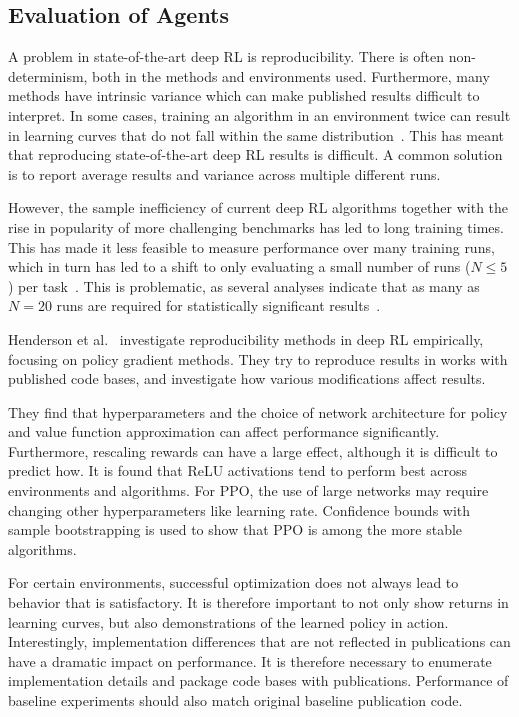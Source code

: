 \subsection{Evaluation of Agents}
\label{sec:theory-evaluation}

A problem in state-of-the-art deep RL is reproducibility.
There is often non-determinism, both in the methods and environments used.
Furthermore, many methods have intrinsic variance which can make published results difficult to interpret.
In some cases, training an algorithm in an environment twice can result in learning curves that do not fall within the same distribution~\cite{henderson_deep_2018}.
This has meant that reproducing state-of-the-art deep RL results is difficult.
A common solution is to report average results and variance across multiple different runs.

However, the sample inefficiency of current deep RL algorithms together with the rise in popularity of more challenging benchmarks has led to long training times.
This has made it less feasible to measure performance over many training runs,
which in turn has led to a shift to only evaluating a small number of runs (\(N \leq 5\)) per task~\cite{agarwal_deep_2022}.
This is problematic, as several analyses indicate that as many as \(N = 20\) runs are required for statistically significant results~\cite{colas_how_2018,colas_hitchhikers_2019}.

Henderson et al.~\cite{henderson_deep_2018} investigate reproducibility methods in deep RL empirically, focusing on policy gradient methods.
They try to reproduce results in works with published code bases, and investigate how various modifications affect results.

They find that hyperparameters and the choice of network architecture for policy and value function approximation can affect performance significantly.
Furthermore, rescaling rewards can have a large effect, although it is difficult to predict how.
It is found that ReLU activations tend to perform best across environments and algorithms.
For PPO, the use of large networks may require changing other hyperparameters like learning rate.
Confidence bounds with sample bootstrapping is used to show that PPO is among the more stable algorithms.

For certain environments, successful optimization does not always lead to behavior that is satisfactory.
It is therefore important to not only show returns in learning curves, but also demonstrations of the learned policy in action.
Interestingly, implementation differences that are not reflected in publications can have a dramatic impact on performance.
It is therefore necessary to enumerate implementation details and package code bases with publications.
Performance of baseline experiments should also match original baseline publication code.


